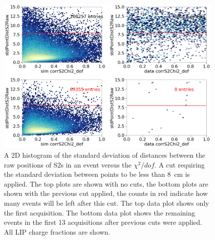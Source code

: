 \begin{figure}[htbp]
\begin{center}
\includegraphics[width=\textwidth]{figures/lips/cut7.png}
\caption{A 2D histogram of the standard deviation of distances between the raw positions of S2s in an event versus the $\chi^{2}/dof$. A cut requiring the standard deviation between points to be less than 8~cm is applied. The top plots are shown with no cuts, the bottom plots are shown with the previous cut applied, the counts in red indicate how many events will be left after this cut. The top data plot shows only the first acquisition. The bottom data plot shows the remaining events in the first 13 acquisitions after previous cuts were applied. All \acs{LIP} charge fractions are shown.  }
\label{fig:cut7}
\end{center}
\end{figure}

